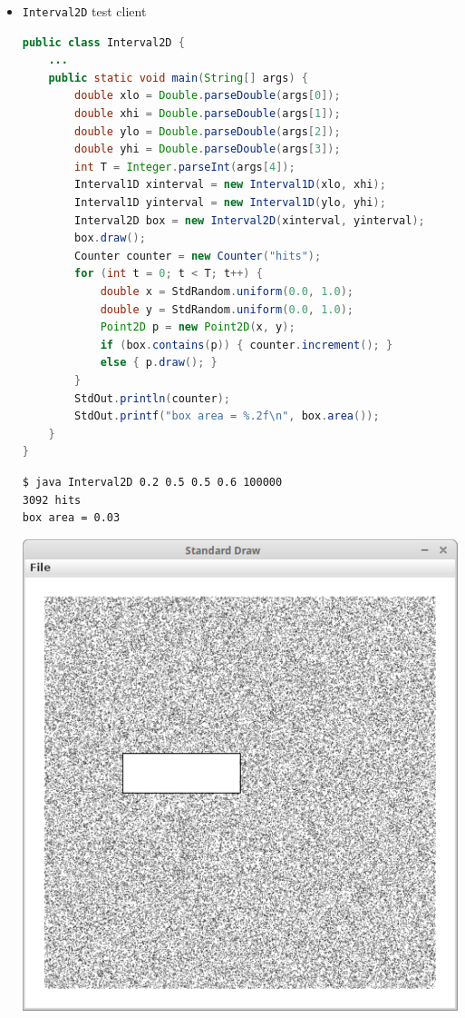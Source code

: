 \documentclass[8pt,a4paper,compress]{beamer}
\begin{document}
\begin{frame}[fragile]
\begin{itemize}
\item \lstinline{Interval2D} test client
\begin{lstlisting}[language=Java]
public class Interval2D {
    ...
    public static void main(String[] args) {
        double xlo = Double.parseDouble(args[0]);
        double xhi = Double.parseDouble(args[1]);
        double ylo = Double.parseDouble(args[2]);
        double yhi = Double.parseDouble(args[3]);
        int T = Integer.parseInt(args[4]);
        Interval1D xinterval = new Interval1D(xlo, xhi);
        Interval1D yinterval = new Interval1D(ylo, yhi);
        Interval2D box = new Interval2D(xinterval, yinterval);
        box.draw();
        Counter counter = new Counter("hits");
        for (int t = 0; t < T; t++) {
            double x = StdRandom.uniform(0.0, 1.0);
            double y = StdRandom.uniform(0.0, 1.0);
            Point2D p = new Point2D(x, y);
            if (box.contains(p)) { counter.increment(); }
            else { p.draw(); }
        }
        StdOut.println(counter);
        StdOut.printf("box area = %.2f\n", box.area());
    }
}
\end{lstlisting}

\begin{minipage}{160pt}
\begin{lstlisting}[language={}]
$ java Interval2D 0.2 0.5 0.5 0.6 100000
3092 hits
box area = 0.03
\end{lstlisting}
\end{minipage}%
\begin{minipage}{120pt}
\hfill \includegraphics[scale=0.1]{./figures/interval2D.pdf}
\end{minipage}
\end{itemize}
\end{frame}
\end{document}
